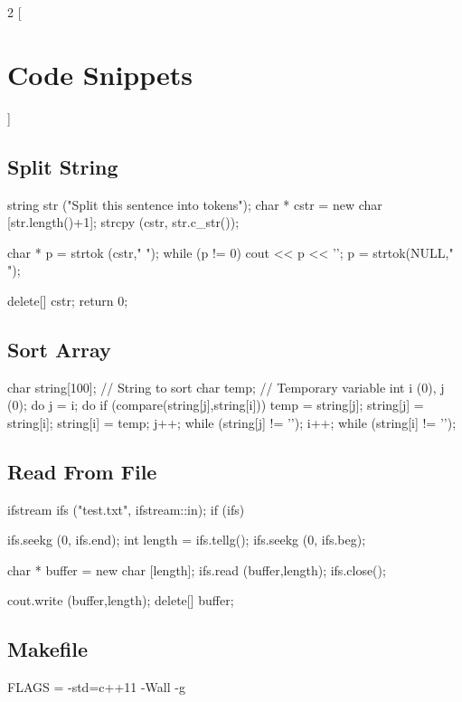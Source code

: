 \documentclass[10pt,a4paper]{extarticle}
\begin{document}
\pagebreak

\begin{multicols}{2}
[\section*{Code Snippets}]


\subsection*{Split String}
\begin{cppcode}
  string str ("Split this sentence into tokens");
  char * cstr = new char [str.length()+1];
  strcpy (cstr, str.c_str());

  char * p = strtok (cstr," ");
  while (p != 0){
    cout << p << '\n';
    p = strtok(NULL," ");
  }

  delete[] cstr;
  return 0;
\end{cppcode}

\subsection*{Sort Array}
\begin{cppcode}
  char string[100];   // String to sort
  char temp;          // Temporary variable
  int i (0), j (0);
  do {
    j = i;
    do {
      if (compare(string[j],string[i])){
        temp = string[j];
        string[j] = string[i];
        string[i] = temp;
      } 
      j++;
    } while (string[j] != '\0');
    i++;
  } while (string[i] != '\0');
\end{cppcode}

\subsection*{Read From File}
\begin{cppcode}
  ifstream ifs ("test.txt", ifstream::in);
  if (ifs) {
    ifs.seekg (0, ifs.end);
    int length = ifs.tellg();
    ifs.seekg (0, ifs.beg);

    char * buffer = new char [length];
    ifs.read (buffer,length);
    ifs.close();

    cout.write (buffer,length);
    delete[] buffer;
  }
\end{cppcode}

\subsection*{Makefile}
\begin{bashcode}
  FLAGS = -std=c++11 -Wall -g


\end{bashcode}
\end{multicols}
\end{document}
